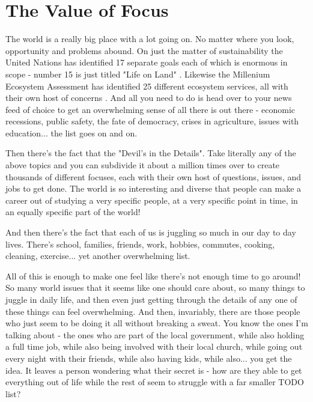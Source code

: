 \documentclass[11pt,a5paper]{book}
\begin{document}
\chapter{The Value of Focus}
The world is a really big place with a lot going on. No matter where you look, opportunity and problems abound. On just the matter of sustainability the United Nations has identified 17 separate goals each of which is enormous in scope - number 15 is just titled "Life on Land" \cite{united}. Likewise the Millenium Ecosystem Assessment has identified 25 different ecosystem services, all with their own host of concerns \cite{mas}. And all you need to do is head over to your news feed of choice to get an overwhelming sense of all there is out there - economic recessions, public safety, the fate of democracy, crises in agriculture, issues with education... the list goes on and on.
\newline

Then there's the fact that the "Devil's in the Details". Take literally any of the above topics and you can subdivide it about a million times over to create thousands of different focuses, each with their own host of questions, issues, and jobs to get done. The world is so interesting and diverse that people can make a career out of studying a very specific people, at a very specific point in time, in an equally specific part of the world! 
\newline

And then there's the fact that each of us is juggling so much in our day to day lives. There's school, families, friends, work, hobbies, commutes, cooking, cleaning, exercise... yet another overwhelming list. 
\newline

All of this is enough to make one feel like there's not enough time to go around! So many world issues that it seems like one should care about, so many things to juggle in daily life, and then even just getting through the details of any one of these things can feel overwhelming. And then, invariably, there are those people who just seem to be doing it all without breaking a sweat. You know the ones I'm talking about - the ones who are part of the local government, while also holding a full time job, while also being involved with their local church, while going out every night with their friends, while also having kids, while also... you get the idea. It leaves a person wondering what their secret is - how are they able to get everything out of life while the rest of seem to struggle with a far smaller TODO list?
\newline
\end{document}
